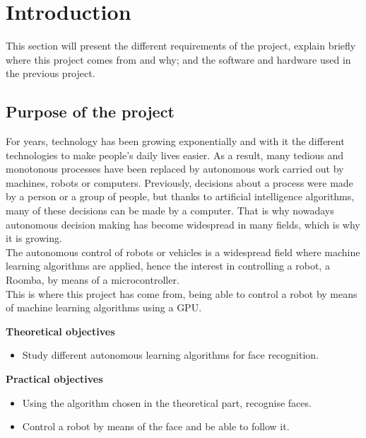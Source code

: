 \clearpage
\newpage
\section{Introduction}

{This section will present the different requirements of the project, explain briefly where this project comes from and why; and the software and hardware used in the previous project.}

\subsection{Purpose of the project}
{
For years, technology has been growing exponentially and with it the different technologies to make people's daily lives easier. As a result, many tedious and monotonous processes have been replaced by autonomous work carried out by machines, robots or computers. Previously, decisions about a process were made by a person or a group of people, but thanks to artificial intelligence algorithms, many of these decisions can be made by a computer. That is why nowadays autonomous decision making has become widespread in many fields, which is why it is growing.\\
The autonomous control of robots or vehicles is a widespread field where machine learning algorithms are applied, hence the interest in controlling a robot, a Roomba, by means of a microcontroller. \\
This is where this project has come from, being able to control a robot by means of machine learning algorithms using a GPU.
}

{
\textbf{Theoretical objectives}
\begin{itemize}
\item Study different autonomous learning algorithms for face recognition.
\end{itemize}

\textbf{Practical objectives}
\begin{itemize}
\item Using the algorithm chosen in the theoretical part, recognise faces.
\item Control a robot by means of the face and be able to follow it.

\end{itemize}
}

